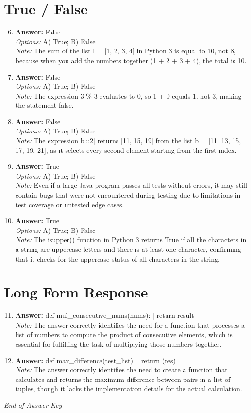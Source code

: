 \documentclass[12pt]{article}
\begin{document}
\section*{True / False}
\begin{enumerate}[label=\arabic*.]
\setcounter{enumi}{5}
\item \textbf{Answer:} False
\\ \textit{Options:} A) True; B) False
\\ \textit{Note:} The sum of the list l = [1, 2, 3, 4] in Python 3 is equal to 10, not 8, because when you add the numbers together (1 + 2 + 3 + 4), the total is 10.
\item \textbf{Answer:} False
\\ \textit{Options:} A) True; B) False
\\ \textit{Note:} The expression 3 \% 3 evaluates to 0, so 1 + 0 equals 1, not 3, making the statement false.
\item \textbf{Answer:} False
\\ \textit{Options:} A) True; B) False
\\ \textit{Note:} The expression b[::2] returns [11, 15, 19] from the list b = [11, 13, 15, 17, 19, 21], as it selects every second element starting from the first index.
\item \textbf{Answer:} True
\\ \textit{Options:} A) True; B) False
\\ \textit{Note:} Even if a large Java program passes all tests without errors, it may still contain bugs that were not encountered during testing due to limitations in test coverage or untested edge cases.
\item \textbf{Answer:} True
\\ \textit{Options:} A) True; B) False
\\ \textit{Note:} The isupper() function in Python 3 returns True if all the characters in a string are uppercase letters and there is at least one character, confirming that it checks for the uppercase status of all characters in the string.
\end{enumerate}

\section*{Long Form Response}
\begin{enumerate}[label=\arabic*.]
\setcounter{enumi}{10}
\item \textbf{Answer:} def mul\_consecutive\_nums(nums): | return result
\\ \textit{Note:} The answer correctly identifies the need for a function that processes a list of numbers to compute the product of consecutive elements, which is essential for fulfilling the task of multiplying those numbers together.
\item \textbf{Answer:} def max\_difference(test\_list): | return (res)
\\ \textit{Note:} The answer correctly identifies the need to create a function that calculates and returns the maximum difference between pairs in a list of tuples, though it lacks the implementation details for the actual calculation.
\end{enumerate}

\vfill
\noindent\textit{End of Answer Key}
\end{document}
